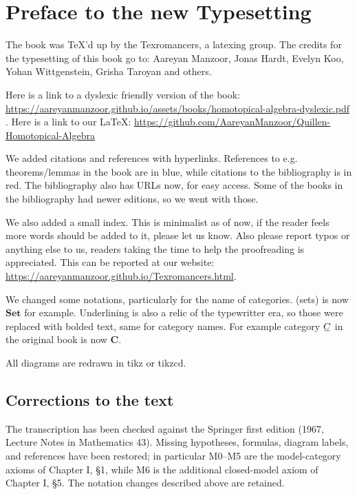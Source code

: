 \documentclass[../main]{subfiles}
\begin{document}
\chapter*{Preface to the new Typesetting}

The book was TeX'd up by the Texromancers, a latexing group. The credits for the typesetting of this book go to:  Aareyan Manzoor, Jonas Hardt, Evelyn Koo, Yohan Wittgenstein, Grisha Taroyan and others.

Here is a link to a dyslexic friendly version of the book:
\url{https://aareyanmanzoor.github.io/assets/books/homotopical-algebra-dyslexic.pdf} . Here is a link to our \LaTeX : \url{https://github.com/AareyanManzoor/Quillen-Homotopical-Algebra}

We added citations and references with hyperlinks. References to e.g. theorems/lemmas in the book are in blue, while citations to the bibliography is
in red. The bibliography also has URLs now, for easy access. Some of the books
in the bibliography had newer editions, so we went with those.

We also added a small index. This is minimalist as of now, if the reader feels more words should be added to it, please let us know. Also please report typos or anything else to us, readers taking the time to help the proofreading is appreciated. This can be reported at our website: \url{https://aareyanmanzoor.github.io/Texromancers.html}.

We changed some notations, particularly for the name of categories. (sets) is now $\mathbf{Set}$ for example. Underlining is also a relic of the typewritter era, so those were replaced with bolded text, same for category names. For example category $\xunderline{C}$ in the original book is now $\mathbf{C}$.

All diagrams are redrawn in tikz or tikzcd.

\section*{Corrections to the text}
The transcription has been checked against the Springer first edition (1967,
Lecture Notes in Mathematics 43). Missing hypotheses, formulas, diagram labels,
and references have been restored; in particular M0--M5 are the model-category
axioms of Chapter I, \S1, while M6 is the additional closed-model axiom of
Chapter I, \S5. The notation changes described above are retained.
\end{document}
